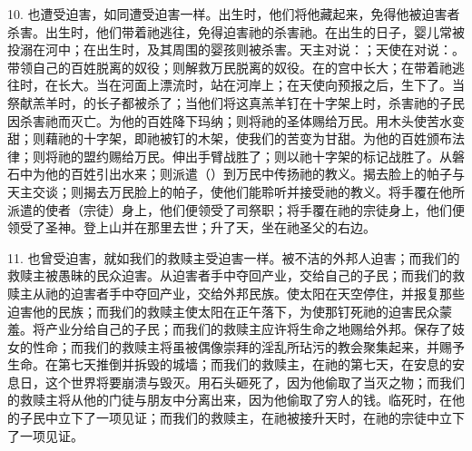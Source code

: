 10. 也遭受迫害，如同遭受迫害一样。出生时，他们将他藏起来，免得他被迫害者杀害。出生时，他们带着祂逃往，免得迫害祂的杀害祂。在出生的日子，婴儿常被投溺在河中；在出生时，及其周围的婴孩则被杀害。天主对说：；天使在对说：。带领自己的百姓脱离的奴役；则解救万民脱离的奴役。在的宫中长大；在带着祂逃往时，在长大。当在河面上漂流时，站在河岸上；在天使向预报之后，生下了。当祭献羔羊时，的长子都被杀了；当他们将这真羔羊钉在十字架上时，杀害祂的子民因杀害祂而灭亡。为他的百姓降下玛纳；则将祂的圣体赐给万民。用木头使苦水变甜；则藉祂的十字架，即祂被钉的木架，使我们的苦变为甘甜。为他的百姓颁布法律；则将祂的盟约赐给万民。伸出手臂战胜了；则以祂十字架的标记战胜了。从磐石中为他的百姓引出水来；则派遣（）到万民中传扬祂的教义。揭去脸上的帕子与天主交谈；则揭去万民脸上的帕子，使他们能聆听并接受祂的教义。将手覆在他所派遣的使者（宗徒）身上，他们便领受了司祭职；将手覆在祂的宗徒身上，他们便领受了圣神。登上山并在那里去世；升了天，坐在祂圣父的右边。\par

11. 也曾受迫害，就如我们的救赎主受迫害一样。被不洁的外邦人迫害；而我们的救赎主被愚昧的民众迫害。从迫害者手中夺回产业，交给自己的子民；而我们的救赎主从祂的迫害者手中夺回产业，交给外邦民族。使太阳在天空停住，并报复那些迫害他的民族；而我们的救赎主使太阳在正午落下，为使那钉死祂的迫害民众蒙羞。将产业分给自己的子民；而我们的救赎主应许将生命之地赐给外邦。保存了妓女的性命；而我们的救赎主将虽被偶像崇拜的淫乱所玷污的教会聚集起来，并赐予生命。在第七天推倒并拆毁的城墙；而我们的救赎主，在祂的第七天，在安息的安息日，这个世界将要崩溃与毁灭。用石头砸死了，因为他偷取了当灭之物；而我们的救赎主将从他的门徒与朋友中分离出来，因为他偷取了穷人的钱。临死时，在他的子民中立下了一项见证；而我们的救赎主，在祂被接升天时，在祂的宗徒中立下了一项见证。\par

